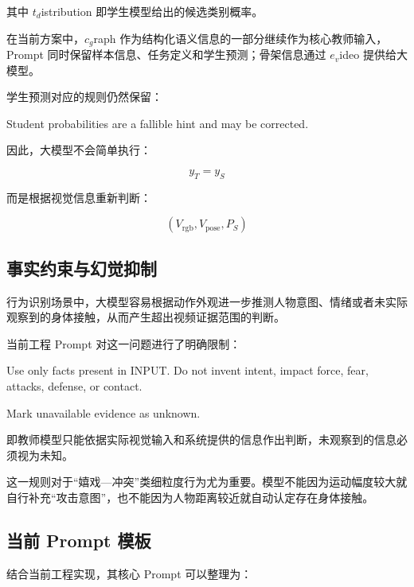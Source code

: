 其中 \(t_d\)istribution 即学生模型给出的候选类别概率。

在当前方案中，\(c_g\)raph 作为结构化语义信息的一部分继续作为核心教师输入，Prompt 同时保留样本信息、任务定义和学生预测；骨架信息通过 \(e_v\)ideo 提供给大模型。

学生预测对应的规则仍然保留：

\begin{NotionCode}
Student probabilities are a fallible hint and may be corrected.
\end{NotionCode}

因此，大模型不会简单执行：

\[
y_T=y_S
\]

而是根据视觉信息重新判断：

\[
\left(
V_{\mathrm{rgb}},
V_{\mathrm{pose}},
P_S
\right)
\]

\subsection{事实约束与幻觉抑制}

行为识别场景中，大模型容易根据动作外观进一步推测人物意图、情绪或者未实际观察到的身体接触，从而产生超出视频证据范围的判断。

当前工程 Prompt 对这一问题进行了明确限制：

\begin{NotionCode}
Use only facts present in INPUT.
Do not invent intent, impact force, fear, attacks,
defense, or contact.

Mark unavailable evidence as unknown.
\end{NotionCode}

即教师模型只能依据实际视觉输入和系统提供的信息作出判断，未观察到的信息必须视为未知。

这一规则对于“嬉戏—冲突”类细粒度行为尤为重要。模型不能因为运动幅度较大就自行补充“攻击意图”，也不能因为人物距离较近就自动认定存在身体接触。

\subsection{当前 Prompt 模板}

结合当前工程实现，其核心 Prompt 可以整理为：

